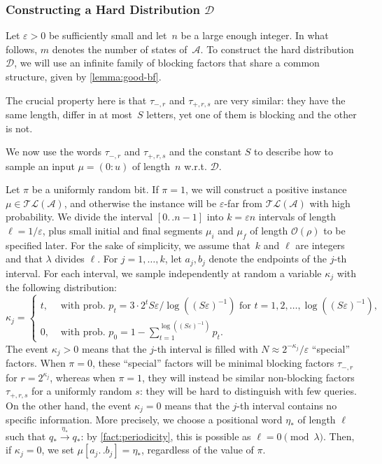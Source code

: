 \documentclass[letterpaper, USenglish, cleveref, autoref, thm-restate, numberwithinsect]{lipics-v2021}
\theoremstyle{theorem}
\theoremstyle{definition}
\newcommand{\Aa}{\mathcal{A}}
\newcommand{\cO}{\mathcal{O}}
\newcommand{\dd}{.\,.}
\newcommand{\Dd}{\mathcal{D}}
\newcommand{\eps}{\varepsilon}
\newcommand{\timedlang}[1]{\mathcal{TL}( #1 )}
\newcommand{\timedword}[2]{(#1:#2)}
\newcommand{\twu}{\timedword{0}{u}}
\begin{document}
\subsubsection{Constructing a Hard Distribution $\Dd$}
Let $\eps > 0$ be sufficiently small and let~$n$ be a large enough integer.
In what follows, $m$ denotes the number of states of~$\Aa$.
To construct the hard distribution $\Dd$, we will use an infinite family of blocking factors that share a common structure, given by \cref{lemma:good-bf}.

The crucial property here is that $\tau_{-,r}$ and $\tau_{+,r, s}$ are very similar: they have the same length, differ in at most~$S$ letters, yet one of them is blocking and the other is not.

We now use the words $\tau_{-,r}$ and $\tau_{+,r,s}$ and the constant $ S$ to describe how to sample an input $\mu = \twu$ of length~$n$ w.r.t. $\Dd$.

Let $\pi$ be a uniformly random bit. If $\pi = 1$, we will construct a positive instance $\mu \in \timedlang{\Aa}$, and otherwise the instance will be $\eps$-far from $\timedlang{\Aa}$ with high probability.
We divide the interval $[0 \dd n-1]$ into $k = \eps n$ intervals of length $\ell = 1/\eps$, plus small initial and final segments $\mu_i$ and $\mu_f$ of length $\cO(\rho)$ to be specified later.
For the sake of simplicity, we assume that~$k$ and $\ell$ are integers and that $\lambda$ divides $\ell$.
For $j=1,\ldots, k$, let $a_j, b_j$ denote the endpoints of the $j$-th interval.
For each interval, we sample independently at random a variable $\kappa_j$ with the following distribution:
\begin{equation}
    \kappa_j = \begin{cases}
        t, &\text{ with prob. } p_t = 3\cdot 2^t S\eps/\log(( S\eps)^{-1}) \text{ for } t = 1,2,\ldots, \log(( S\eps)^{-1}),\\
        0,&\text{ with prob. } p_0 = 1 - \sum_{t=1}^{{\log(( S\eps)^{-1})}} p_t.
    \end{cases} 
\end{equation}
The event $\kappa_j > 0$ means that the $j$-th interval is filled with $N \approx 2^{-\kappa_j}/\eps$ ``special'' factors.
When $\pi = 0$, these ``special'' factors will be minimal blocking factors $\tau_{-, r}$ for $r = 2^{\kappa_j}$, whereas when $\pi = 1$, they will instead be similar non-blocking factors $\tau_{+, r, s}$ for a uniformly random $s$: they will be hard to distinguish with few queries.
On the other hand, the event $\kappa_j = 0$ means that the $j$-th interval contains no specific information.
More precisely, we choose a positional word $\eta_*$ of length $\ell$ such that $q_* \xrightarrow{\eta_*} q_*$: by \cref{fact:periodicity}, this is possible as $\ell = 0 \pmod\lambda$. Then, if $\kappa_j = 0$, we set $\mu[a_j\dd b_j] = \eta_*$, regardless of the value of $\pi$.
\end{document}
